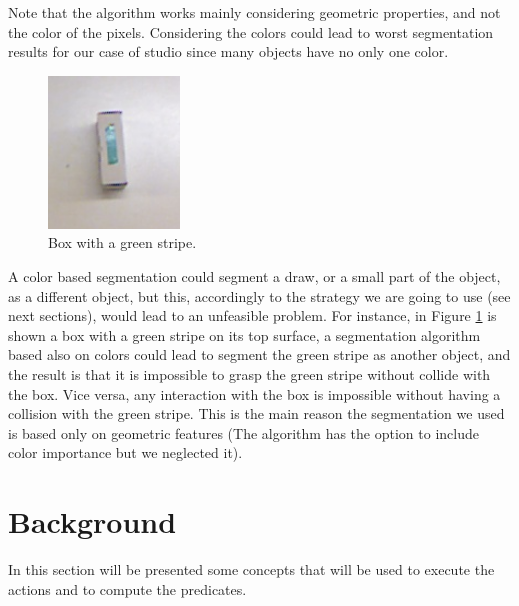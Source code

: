 Note that the algorithm works mainly considering geometric properties, and not the color of the pixels. Considering the colors could lead to worst segmentation results for our case of studio since many objects have no only one color.

\begin{figure}
\centering
\caption{Box with a green stripe.}\label{fig:seg_color}
\includegraphics[width=3.5cm]{Img/ObjectSegmentation/color_seg_problem.png}
\end{figure}
A color based segmentation could segment a draw, or a small part of the object, as a different object, but this, accordingly to the strategy we are going to use (see next sections), would lead to an unfeasible problem. 
For instance, in Figure \ref{fig:seg_color} is shown a box with a green stripe on its top surface, a segmentation algorithm based also on colors could lead to segment the green stripe as another object, and the result is that it is impossible to grasp the green stripe without collide with the box. Vice versa, any interaction with the box is impossible without having a collision with the green stripe. This is the main reason the segmentation we used is based only on geometric features (The  algorithm has the option to include color importance but we neglected it). 


\section{Background}
\label{sec:background_alg}

In this section will be presented some concepts that will be used to execute the actions and to compute the predicates. 

